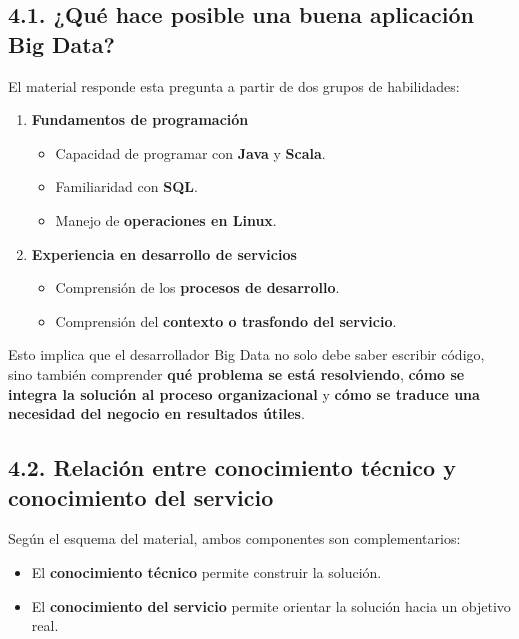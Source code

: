 \documentclass[8pt,a4paper,twocolumn]{article}
\begin{document}
\subsection*{4.1. ¿Qué hace posible una buena aplicación Big Data?}

El material responde esta pregunta a partir de dos grupos de habilidades:

\begin{enumerate}[leftmargin=*]
    \item \textbf{Fundamentos de programación}
    \begin{itemize}[leftmargin=*]
        \item Capacidad de programar con \textbf{Java} y \textbf{Scala}.
        \item Familiaridad con \textbf{SQL}.
        \item Manejo de \textbf{operaciones en Linux}.
    \end{itemize}
    
    \item \textbf{Experiencia en desarrollo de servicios}
    \begin{itemize}[leftmargin=*]
        \item Comprensión de los \textbf{procesos de desarrollo}.
        \item Comprensión del \textbf{contexto o trasfondo del servicio}.
    \end{itemize}
\end{enumerate}

Esto implica que el desarrollador Big Data no solo debe saber escribir código, sino también comprender \textbf{qué problema se está resolviendo}, \textbf{cómo se integra la solución al proceso organizacional} y \textbf{cómo se traduce una necesidad del negocio en resultados útiles}.

\subsection*{4.2. Relación entre conocimiento técnico y conocimiento del servicio}

Según el esquema del material, ambos componentes son complementarios:

\begin{itemize}[leftmargin=*]
    \item El \textbf{conocimiento técnico} permite construir la solución.
    \item El \textbf{conocimiento del servicio} permite orientar la solución hacia un objetivo real.
\end{itemize}
\end{document}
